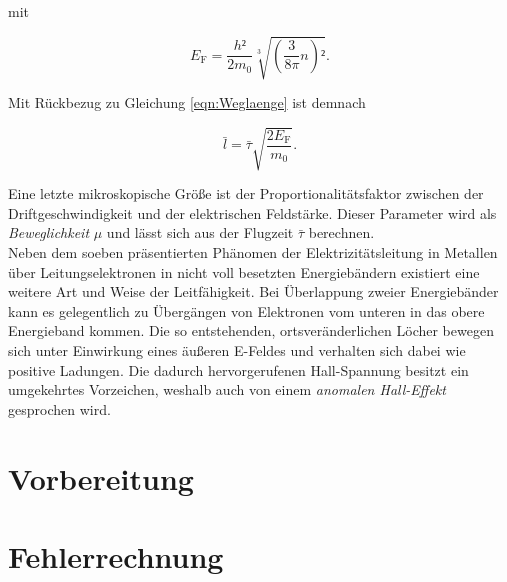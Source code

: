 \noindent mit 

\begin{equation*}
    E_\text{F} = \frac{h²}{2m_0}\sqrt[3]{\left(\frac{3}{8\pi}n\right)²}.
\end{equation*}

\noindent Mit Rückbezug zu Gleichung \eqref{eqn:Weglaenge} ist demnach 

\begin{equation*}
    \bar{l} = \bar{\tau}\sqrt{\frac{2E_\text{F}}{m_0}}.
\end{equation*}

\noindent Eine letzte mikroskopische Größe ist der Proportionalitätsfaktor zwischen der Driftgeschwindigkeit und der
elektrischen Feldstärke. Dieser Parameter wird als \emph{Beweglichkeit} $\mu$ und lässt sich aus der Flugzeit
$\bar{\tau}$ berechnen.\\

\noindent Neben dem soeben präsentierten Phänomen der Elektrizitätsleitung in Metallen
über Leitungselektronen in nicht voll besetzten Energiebändern existiert eine weitere Art und Weise der Leitfähigkeit.
Bei Überlappung zweier Energiebänder kann es gelegentlich zu Übergängen von Elektronen vom unteren in das 
obere Energieband kommen. Die so entstehenden, ortsveränderlichen Löcher bewegen sich unter Einwirkung eines äußeren 
E-Feldes und verhalten sich dabei wie positive Ladungen. Die dadurch hervorgerufenen Hall-Spannung besitzt ein 
umgekehrtes Vorzeichen, weshalb auch von einem \emph{anomalen Hall-Effekt} gesprochen wird. 

\section{Vorbereitung}


\section{Fehlerrechnung}
